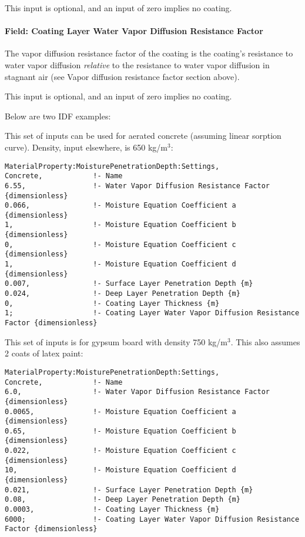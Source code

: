 This input is optional, and an input of zero implies no coating.

\paragraph{Field: Coating Layer Water Vapor Diffusion Resistance Factor}\label{field-coating-layer-water-vapor-diffusion-resistance-factor}

The vapor diffusion resistance factor of the coating is the coating's resistance to water vapor diffusion \emph{relative} to the resistance to water vapor diffusion in stagnant air (see Vapor diffusion resistance factor section above).

This input is optional, and an input of zero implies no coating.

Below are two IDF examples:

This set of inputs can be used for aerated concrete (assuming linear sorption curve). Density, input elsewhere, is 650 kg/m$^3$:

\begin{lstlisting}
MaterialProperty:MoisturePenetrationDepth:Settings,
Concrete,            !- Name
6.55,                !- Water Vapor Diffusion Resistance Factor {dimensionless}
0.066,               !- Moisture Equation Coefficient a {dimensionless}
1,                   !- Moisture Equation Coefficient b {dimensionless}
0,                   !- Moisture Equation Coefficient c {dimensionless}
1,                   !- Moisture Equation Coefficient d {dimensionless}
0.007,               !- Surface Layer Penetration Depth {m}
0.024,               !- Deep Layer Penetration Depth {m}
0,                   !- Coating Layer Thickness {m}
1;                   !- Coating Layer Water Vapor Diffusion Resistance Factor {dimensionless}
\end{lstlisting}

This set of inputs is for gypsum board with density 750 kg/m$^3$. This also assumes 2 coats of latex paint:

\begin{lstlisting}
MaterialProperty:MoisturePenetrationDepth:Settings,
Concrete,            !- Name
6.0,                 !- Water Vapor Diffusion Resistance Factor {dimensionless}
0.0065,              !- Moisture Equation Coefficient a {dimensionless}
0.65,                !- Moisture Equation Coefficient b {dimensionless}
0.022,               !- Moisture Equation Coefficient c {dimensionless}
10,                  !- Moisture Equation Coefficient d {dimensionless}
0.021,               !- Surface Layer Penetration Depth {m}
0.08,                !- Deep Layer Penetration Depth {m}
0.0003,              !- Coating Layer Thickness {m}
6000;                !- Coating Layer Water Vapor Diffusion Resistance Factor {dimensionless}
\end{lstlisting}

